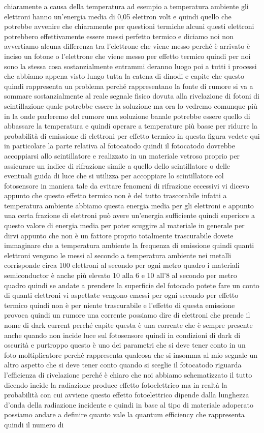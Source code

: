 {chiaramente a causa della temperatura ad esempio a temperatura ambiente gli elettroni hanno un'energia media di 0,05 elettron volt e quindi quello che potrebbe avvenire che chiaramente per questioni termiche alcuni questi elettroni potrebbero effettivamente essere messi perfetto termico e diciamo noi non avvertiamo alcuna differenza tra l'elettrone che viene messo perché è arrivato è inciso un fotone o l'elettrone che viene messo per effetto termico quindi per noi sono la stessa cosa sostanzialmente entrammi deranno luogo poi a tutti i processi che abbiamo appena visto lungo tutta la catena di dinodi e capite che questo quindi rappresenta un problema perché rappresentano la fonte di rumore si va a sommare sostanzialmente al reale segnale fisico dovuta alla rivelazione di fotoni di scintillazione quale potrebbe essere la soluzione ma ora lo vedremo comunque più in la onde parleremo del rumore una soluzione banale potrebbe essere quello di abbassare la temperatura e quindi operare a temperature più basse per ridurre la probabilità di emissione di elettroni per effetto termico in questa figura vedete qui in particolare la parte relativa al fotocatodo quindi il fotocatodo dovrebbe accoppiarsi allo scintillatore e realizzato in un materiale vetroso proprio per assicurare un indice di rifrazione simile a quello dello scintillatore o delle eventuali guida di luce che si utilizza per accoppiare lo scintillatore col fotosensore in maniera tale da evitare fenomeni di rifrazione eccessivi vi dicevo appunto che questo effetto termico non è del tutto trascorabile infatti a temperatura ambiente abbiamo questa energia media per gli elettroni e appunto una certa frazione di elettroni può avere un'energia sufficiente quindi superiore a questo valore di energia media per poter scuggire al materiale in generale per dirvi appunto che non è un fattore proprio totalmente trascurabile dovete immaginare che a temperatura ambiente la frequenza di emissione quindi quanti elettroni vengono le messi al secondo a temperatura ambiente nei metalli corrisponde circa 100 elettroni al secondo per ogni metro quadro i materiali semiconductor è anche più elevato 10 alla 6 e 10 all'8 al secondo per metro quadro quindi se andate a prendere la superficie del fotocado potete fare un conto di quanti elettroni vi aspettate vengono emessi per ogni secondo per effetto termico quindi non è per niente trascurabile e l'effetto di questa emissione provoca quindi un rumore una corrente possiamo dire di elettroni che prende il nome di dark current perché capite questa è una corrente che è sempre presente anche quando non incide luce sul fotosensore quindi in condizioni di dark di oscurità e purtroppo questo è uno dei parametri che si deve tener conto in un foto moltiplicatore perché rappresenta qualcosa che si insomma al mio segnale un altro aspetto che si deve tener conto quando si sceglie il fotocatodo riguarda l'efficienza di rivelazione perché è chiaro che noi abbiamo schematizzato il tutto dicendo incide la radiazione produce effetto fotoelettrico ma in realtà la probabilità con cui avviene questo effetto fotoelettrico dipende dalla lunghezza d'onda della radiazione incidente e quindi in base al tipo di materiale adoperato possiamo andare a definire quanto vale la quantum efficiency che rappresenta quindi il numero di }
